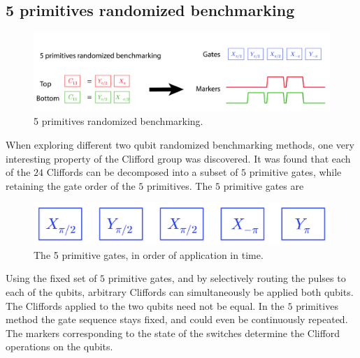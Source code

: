       \subsection{5 primitives randomized benchmarking}
        \label{ssec:5 primitives randomized benchmarking}

        \begin{figure}[h]
          \centering
          \includegraphics[width=\textwidth]{Figures/Randomized benchmarking/5 primitives RB.jpg}
          \caption{5 primitives randomized benchmarking.}
          \label{fig:5 primitives RB schematic}
        \end{figure}

        When exploring different two qubit randomized benchmarking methods, one very interesting property of the Clifford group was discovered. It was found that each of the $24$ Cliffords can be decomposed into a subset of $5$ primitive gates, while retaining the gate order of the $5$ primitives. The $5$ primitive gates are

        \begin{figure}[h!]
          \centering
          \includegraphics[width=.5\textwidth]{Figures/Randomized benchmarking/5 primitive gates.jpg}
          \caption{The 5 primitive gates, in order of application in time.}
          \label{5 primitive gates}
        \end{figure}

        Using the fixed set of $5$ primitive gates, and by selectively routing the pulses to each of the qubits, arbitrary Cliffords can simultaneously be applied both qubits. The Cliffords applied to the two qubits need not be equal. In the $5$ primitives method the gate sequence stays fixed, and could even be continuously repeated. The markers corresponding to the state of the switches determine the Clifford operations on the qubits.

